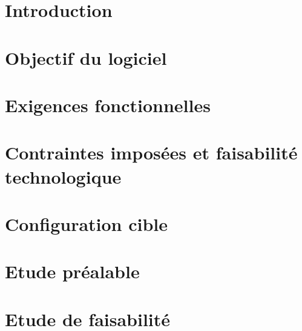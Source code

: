 
\section{Introduction}

\section{Objectif du logiciel}

\section{Exigences fonctionnelles}

\section{Contraintes imposées et faisabilité technologique}

\section{Configuration cible}

\appendix

\section{Etude préalable}

\section{Etude de faisabilité}
